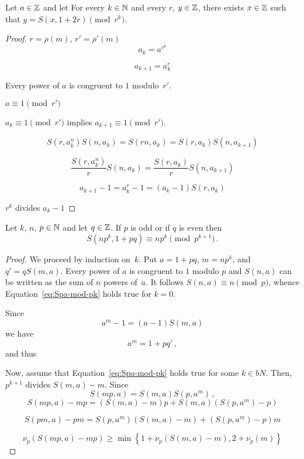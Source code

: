 \begin{theorem}
   Let $a \in \mathbb{Z}$ and let 
   For every $k \in \mathbb{N}$ and every $r$, $y \in \mathbb{Z}$, 
   there exists $x \in \mathbb{Z}$ such that $y = S(x, 1 + 2r) \pmod {r^k}$.  
 \end{theorem}

 \begin{proof}
   $r = \rho(m)$, $r' = \rho'(m)$
   $$
   a_k = a^{r^k} 
   $$

   $$
   a_{k + 1} = a_k^r 
   $$

   Every power of $a$ is congruent to $1$ modulo~$r'$.

   $a \equiv 1 \pmod{r'}$
   
   $a_k \equiv 1 \pmod{r'}$ implies $a_{k + 1} \equiv 1 \pmod{r'}$.
    
   $$
   S(r, a_k^n) S(n, a_k) = S(r n, a_k) = S(r, a_k) S(n, a_{k + 1})
   $$

   $$
   \frac{S(r, a_k^n)}{r} S(n, a_k) = \frac{S(r, a_k)}{r} S(n, a_{k + 1})
   $$

   $$
   a_{k + 1} - 1 = a_k^r - 1 = (a_k - 1) S(r, a_k) 
   $$

   $r^k$ divides $a_k  - 1$

  
 \end{proof}
 
 
   

 
 \begin{theorem} \label{thm:p-odd-pk}
   Let $k$, $n$, $p \in \mathbb{N}$ and let $q \in \mathbb{Z}$.
   If $p$ is odd or if $q$ is even then
   \begin{equation} \label{eq:Spa-mod-pk}
     S(n p^k, 1 + p q) \equiv n p^k \pmod {p^{k + 1} } \,.
   \end{equation}
 \end{theorem}


 \begin{proof}
   We proceed by induction on~$k$.
   Put $a = 1 + p q$,  $m = n p^k$, and $q' = q S(m, a)$.
   Every power of $a$ is congruent to $1$ modulo $p$
   and
   $S(n, a)$ can be written as the sum of $n$ powers of~$a$.
   It follows $S(n, a) \equiv n \pmod {p}$, whence
   Equation~\eqref{eq:Spa-mod-pk} holds true for $k = 0$.

   Since  
   $$
   a^m - 1 = (a - 1) S(m, a) 
   $$
   we have 
   $$
   a^m  = 1 + p q'  \,, 
   $$
   and thus
   
   Now, assume that Equation~\eqref{eq:Spa-mod-pk} holds true for some $k \in bN$.
   Then, $p^{k + 1}$ divides $S(m, a) - m$.
   Since
   $$
   S(m p, a) = S(m, a) S(p, a^m) \, , 
   $$
   $$
   S(m p, a) - m p = (S(m, a) - m) p + S(m, a)(S(p, a^m) - p) 
   $$

   $$
   S(p m, a) - p m = S(p, a^m)(S(m, a) - m) + (S(p, a^m) - p) m
   $$
   
   $$
   \nu_p(S(m p, a) - m p) \ge  \min \left\{ 1 + \nu_p(S(m, a) - m), 2 + \nu_p(m)  \right\}
   $$
 \end{proof}
   


